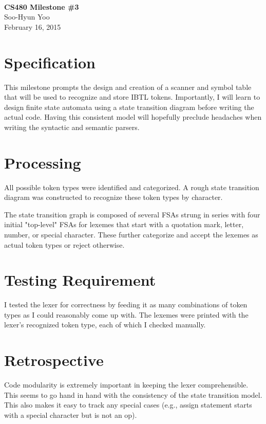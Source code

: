 \documentclass[12pt,letterpaper]{article}
\begin{document}
\fancyfoot{}
\begin{center}
    \hfill \\
    \vspace{4in}
    {\bf\Huge CS480 Milestone \#3 \\}
    \vspace{2in}
    {\Large Soo-Hyun Yoo \\ February 16, 2015}
\end{center}

\newpage
{}



\section*{Specification}


This milestone prompts the design and creation of a scanner and symbol table
that will be used to recognize and store IBTL tokens. Importantly, I will learn
to design finite state automata using a state transition diagram before writing
the actual code. Having this consistent model will hopefully preclude headaches
when writing the syntactic and semantic parsers.

\section*{Processing}


All possible token types were identified and categorized. A rough state
transition diagram was constructed to recognize these token types by character.

The state transition graph is composed of several FSAs strung in series with
four initial "top-level" FSAs for lexemes that start with a quotation mark,
letter, number, or special character. These further categorize and accept the
lexemes as actual token types or reject otherwise.

\section*{Testing Requirement}


I tested the lexer for correctness by feeding it as many combinations of token
types as I could reasonably come up with. The lexemes were printed with the
lexer's recognized token type, each of which I checked manually.

\section*{Retrospective}


Code modularity is extremely important in keeping the lexer comprehensible.
This seems to go hand in hand with the consistency of the state transition
model. This also makes it easy to track any special cases (e.g., assign
statement starts with a special character but is not an op).
\end{document}
